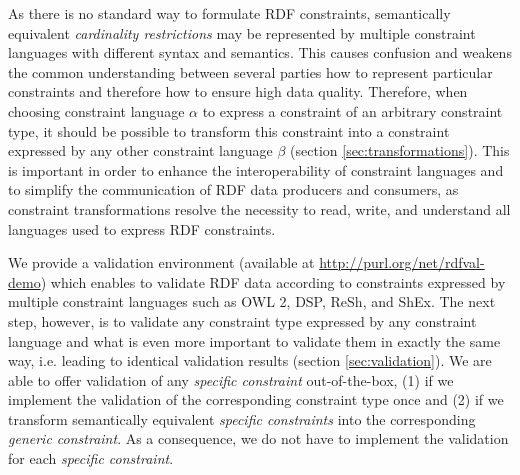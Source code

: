 \documentclass{llncs}
\newcommand{\ms}[1]{\texttt{#1}}
\begin{document}
As there is no standard way to formulate RDF constraints, 
semantically equivalent \emph{cardinality restrictions} may be represented by multiple constraint languages with different syntax and semantics.
This causes confusion and weakens the common understanding between several parties how to represent particular constraints and therefore how to ensure high data quality. 
Therefore, when choosing constraint language \ms{$\alpha$} to express a constraint of an arbitrary constraint type, it should be possible to transform this constraint into a constraint expressed by any other constraint language \ms{$\beta$} (section \ref{sec:transformations}). 
This is important in order to enhance the interoperability of constraint languages and to simplify the communication of RDF data producers and consumers, 
as constraint transformations resolve the necessity to read, write, and understand all languages used to express RDF constraints.

We provide a validation environment (available at \url{http://purl.org/net/rdfval-demo}) which enables to validate RDF data according to constraints expressed by multiple  constraint languages such as OWL 2, DSP, ReSh, and ShEx.
The next step, however, is to validate any constraint type expressed by any constraint language and 
what is even more important to validate them in exactly the same way, i.e. leading to identical validation results (section \ref{sec:validation}). 
We are able to offer validation of any \emph{specific constraint} out-of-the-box, (1) if we implement the validation of the corresponding constraint type once and (2) if we transform semantically equivalent \emph{specific constraints} into the corresponding \emph{generic constraint}. 
As a consequence, we do not have to implement the validation for each \emph{specific constraint}. 



\end{document}
